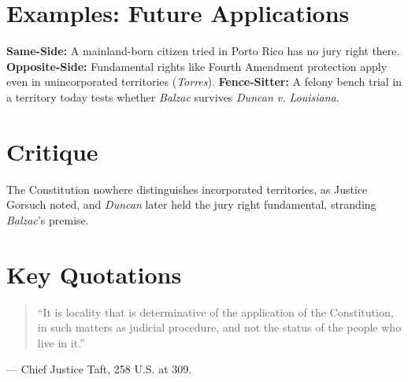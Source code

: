 \documentclass[12pt]{article}
\begin{document}
\section{Examples: Future Applications}
\textbf{Same-Side:} A mainland-born citizen tried in Porto Rico has no jury right there. \textbf{Opposite-Side:} Fundamental rights like Fourth Amendment protection apply even in unincorporated territories (\textit{Torres}). \textbf{Fence-Sitter:} A felony bench trial in a territory today tests whether \textit{Balzac} survives \textit{Duncan v. Louisiana}.

\section{Critique}
The Constitution nowhere distinguishes incorporated territories, as Justice Gorsuch noted, and \textit{Duncan} later held the jury right fundamental, stranding \textit{Balzac}'s premise.

\section{Key Quotations}
\begin{quote}
``It is locality that is determinative of the application of the Constitution, in such matters as judicial procedure, and not the status of the people who live in it.''
\end{quote}
\noindent --- Chief Justice Taft, 258 U.S. at 309.
\end{document}
